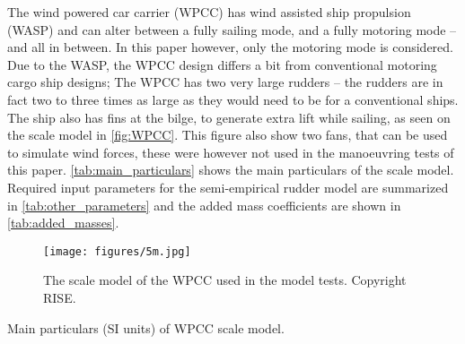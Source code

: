 The wind powered car carrier (WPCC) has wind assisted ship propulsion (WASP) and can alter between a fully sailing mode, and a fully motoring mode -- and all in between. 
In this paper however, only the motoring mode is considered. Due to the WASP, the WPCC design differs a bit from conventional motoring cargo ship designs; The WPCC has two very large rudders -- the rudders are in fact two to three times as large as they would need to be for a conventional ships. The ship also has fins at the bilge, to generate extra lift while sailing, as seen on the scale model in \autoref{fig:WPCC}. This figure also show two fans, that can be used to simulate wind forces, these were however not used in the manoeuvring tests of this paper. \autoref{tab:main_particulars} shows the main particulars of the scale model. Required input parameters for the semi-empirical rudder model are summarized in \autoref{tab:other_parameters} and the added mass coefficients are shown in \autoref{tab:added_masses}.
\begin{figure}[h]
    \centering
    \texttt{[image: figures/5m.jpg]}
    \caption{The scale model of the WPCC used in the model tests. Copyright RISE.}
    \label{fig:WPCC}
\end{figure}
\begin{table}[h]
    \centering
    \caption{Main particulars (SI units) of WPCC scale model.}
    \label{tab:main_particulars}
\end{table}